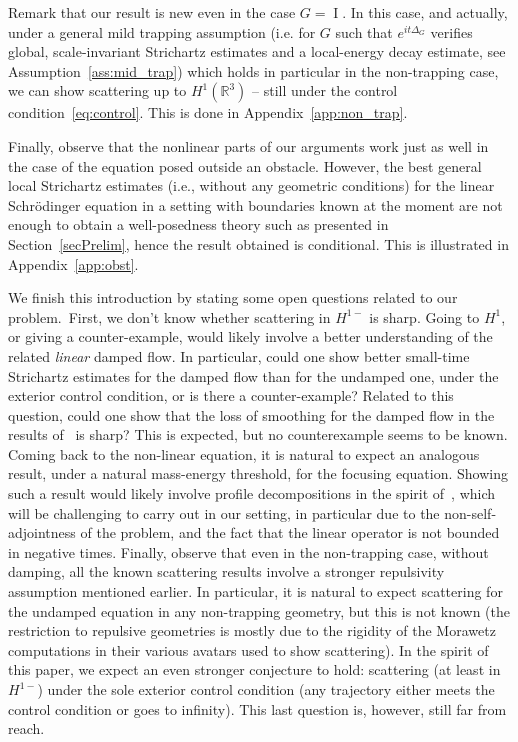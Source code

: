 \documentclass[AHL,Unicode,longabstracts,published]{cedram}
\newcommand*\R{\mathbb{R}}
\DeclareMathOperator{\I}{I}
\begin{document}
Remark that our result is new even in the case $G = \I$. In this case, and actually, under a general mild trapping assumption (i.e. for $G$ such that $e^{it\Delta_G}$ verifies global, scale-invariant Strichartz estimates and a local-energy decay estimate, see Assumption~\ref{ass:mid_trap}) which holds in particular in the non-trapping case, we can show scattering up to $H^1(\R^3)$ -- still under the control condition~\eqref{eq:control}. This is done in Appendix~\ref{app:non_trap}.

Finally, observe that the nonlinear parts of our arguments work just as well in the case of the equation posed outside an obstacle. However, the best general local Strichartz estimates (i.e., without any geometric conditions) for the linear Schr{\"o}dinger equation in a setting with boundaries known at the moment are not enough to obtain a well-posedness theory such as presented in Section~\ref{secPrelim}, hence the result obtained is conditional. This is illustrated in Appendix~\ref{app:obst}.


We finish this introduction by stating some open questions related to our problem.~First, we don't know whether scattering in $H^{1-}$ is sharp. Going to $H^1$, or giving a counter-example, would likely involve a better understanding of the related \emph{linear} damped flow. In particular, could one show better small-time Strichartz estimates for the damped flow than for the undamped one, under the exterior control condition, or is there a counter-example? Related to this question, could one show that the loss of smoothing for the damped flow in the results of~\cite{AlKh07,AlKhRo17, KhRo17} is sharp? This is expected, but no counterexample seems to be known. Coming back to the non-linear equation, it is natural to expect an analogous result, under a natural mass-energy threshold, for the focusing equation. Showing such a result would likely involve profile decompositions in the spirit of~\cite{keMe06}, which will be challenging to carry out in our setting, in particular due to the non-self-adjointness of the problem, and the fact that the linear operator is not bounded in negative times. Finally, observe that even in the non-trapping case, without damping, all the known scattering results involve a stronger repulsivity assumption mentioned earlier. In particular, it is natural to expect scattering for the undamped equation in any non-trapping geometry, but this is not known (the restriction to repulsive geometries is mostly due to the rigidity of the Morawetz computations in their various avatars used to show scattering). In the spirit of this paper, we expect an even stronger conjecture to hold: scattering (at least in $H^{1-}$) under the sole exterior control condition (any trajectory either meets the control condition or goes to infinity). This last question is, however, still far from reach.
\end{document}
